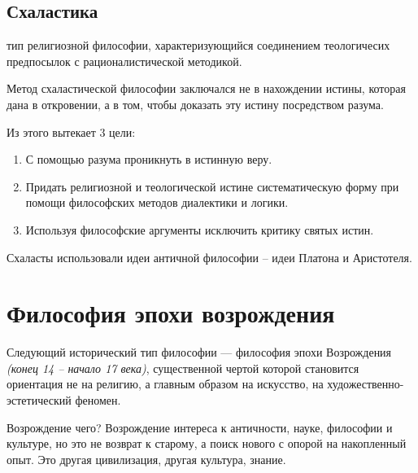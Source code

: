 \documentclass[
]{article}
\providecommand{\tightlist}{%
  \setlength{\itemsep}{0pt}\setlength{\parskip}{0pt}}
\begin{document}
\hypertarget{ux441ux445ux430ux43bux430ux441ux442ux438ux43aux430}{%
\subsection{Схаластика}\label{ux441ux445ux430ux43bux430ux441ux442ux438ux43aux430}}

\begin{description}
\tightlist
\item[\emph{\textbf{Схаластика ---} (рациональная теология)}]
тип религиозной философии, характеризующийся соединением теологичесих
предпосылок с рационалистической методикой.
\end{description}

Метод схаластической философии заключался не в нахождении истины,
которая дана в откровении, а в том, чтобы доказать эту истину
посредством разума.

Из этого вытекает 3 цели:

\begin{enumerate}
\def\labelenumi{\arabic{enumi}.}
\tightlist
\item
  С помощью разума проникнуть в истинную веру.
\item
  Придать религиозной и теологической истине систематическую форму при
  помощи философских методов диалектики и логики.
\item
  Используя философские аргументы исключить критику святых истин.
\end{enumerate}

Схаласты использовали идеи античной философии -- идеи Платона и
Аристотеля.

\hypertarget{ux444ux438ux43bux43eux441ux43eux444ux438ux44f-ux44dux43fux43eux445ux438-ux432ux43eux437ux440ux43eux436ux434ux435ux43dux438ux44f}{%
\section{Философия эпохи
возрождения}\label{ux444ux438ux43bux43eux441ux43eux444ux438ux44f-ux44dux43fux43eux445ux438-ux432ux43eux437ux440ux43eux436ux434ux435ux43dux438ux44f}}

Следующий исторический тип философии --- философия эпохи Возрождения
\emph{(конец 14 -- начало 17 века)}, существенной чертой которой
становится ориентация не на религию, а главным образом на искусство, на
художественно-эстетический феномен.

Возрождение чего? Возрождение интереса к античности, науке, философии и
культуре, но это не возврат к старому, а поиск нового с опорой на
накопленный опыт. Это другая цивилизация, другая культура, знание.
\end{document}
